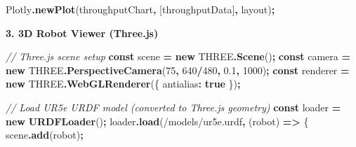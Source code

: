 \documentclass[
]{article}
\newenvironment{Shaded}{\begin{snugshade}}{\end{snugshade}}
\newcommand{\CommentTok}[1]{\textcolor[rgb]{0.56,0.35,0.01}{\textit{#1}}}
\newcommand{\DecValTok}[1]{\textcolor[rgb]{0.00,0.00,0.81}{#1}}
\newcommand{\FloatTok}[1]{\textcolor[rgb]{0.00,0.00,0.81}{#1}}
\newcommand{\FunctionTok}[1]{\textcolor[rgb]{0.13,0.29,0.53}{\textbf{#1}}}
\newcommand{\KeywordTok}[1]{\textcolor[rgb]{0.13,0.29,0.53}{\textbf{#1}}}
\newcommand{\NormalTok}[1]{#1}
\newcommand{\OperatorTok}[1]{\textcolor[rgb]{0.81,0.36,0.00}{\textbf{#1}}}
\newcommand{\StringTok}[1]{\textcolor[rgb]{0.31,0.60,0.02}{#1}}
\begin{document}
\begin{Shaded}
\begin{Highlighting}[]
\NormalTok{Plotly}\OperatorTok{.}\FunctionTok{newPlot}\NormalTok{(}\StringTok{\textquotesingle{}throughputChart\textquotesingle{}}\OperatorTok{,}\NormalTok{ [throughputData]}\OperatorTok{,}\NormalTok{ layout)}\OperatorTok{;}
\end{Highlighting}
\end{Shaded}

\textbf{3. 3D Robot Viewer (Three.js)}

\begin{Shaded}
\begin{Highlighting}[]
\CommentTok{// Three.js scene setup}
\KeywordTok{const}\NormalTok{ scene }\OperatorTok{=} \KeywordTok{new}\NormalTok{ THREE}\OperatorTok{.}\FunctionTok{Scene}\NormalTok{()}\OperatorTok{;}
\KeywordTok{const}\NormalTok{ camera }\OperatorTok{=} \KeywordTok{new}\NormalTok{ THREE}\OperatorTok{.}\FunctionTok{PerspectiveCamera}\NormalTok{(}\DecValTok{75}\OperatorTok{,} \DecValTok{640}\OperatorTok{/}\DecValTok{480}\OperatorTok{,} \FloatTok{0.1}\OperatorTok{,} \DecValTok{1000}\NormalTok{)}\OperatorTok{;}
\KeywordTok{const}\NormalTok{ renderer }\OperatorTok{=} \KeywordTok{new}\NormalTok{ THREE}\OperatorTok{.}\FunctionTok{WebGLRenderer}\NormalTok{(\{ antialias}\OperatorTok{:} \KeywordTok{true}\NormalTok{ \})}\OperatorTok{;}

\CommentTok{// Load UR5e URDF model (converted to Three.js geometry)}
\KeywordTok{const}\NormalTok{ loader }\OperatorTok{=} \KeywordTok{new} \FunctionTok{URDFLoader}\NormalTok{()}\OperatorTok{;}
\NormalTok{loader}\OperatorTok{.}\FunctionTok{load}\NormalTok{(}\StringTok{\textquotesingle{}/models/ur5e.urdf\textquotesingle{}}\OperatorTok{,}\NormalTok{ (robot) }\KeywordTok{=\textgreater{}}\NormalTok{ \{}
\NormalTok{  scene}\OperatorTok{.}\FunctionTok{add}\NormalTok{(robot)}\OperatorTok{;}


\end{Highlighting}
\end{Shaded}
\end{document}
